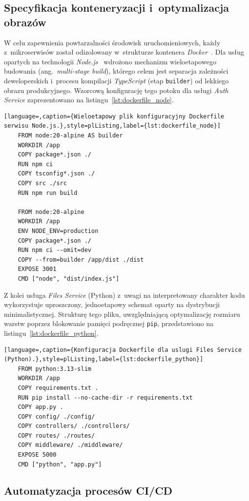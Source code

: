 \documentclass[a4paper,12pt,reqno]{article}
\begin{document}
\subsection{Specyfikacja konteneryzacji i~optymalizacja obrazów}

W celu zapewnienia powtarzalności środowisk uruchomieniowych, każdy z~mikroserwisów został odizolowany w~strukturze kontenera \textit{Docker}~\cite{docker}. Dla usług opartych na technologii \textit{Node.js}~\cite{nodejs} wdrożono mechanizm wieloetapowego budowania (ang.~\textit{multi-stage build}), którego celem jest separacja zależności deweloperskich i~procesu kompilacji \textit{TypeScript} (etap \texttt{builder}) od lekkiego obrazu produkcyjnego. Wzorcową konfigurację tego potoku dla usługi \textit{Auth Service} zaprezentowano na listingu~\ref{lst:dockerfile_node}.

\begin{lstlisting}[language=,caption={Wieloetapowy plik konfiguracyjny Dockerfile serwisu Node.js.},style=plListing,label={lst:dockerfile_node}]
	FROM node:20-alpine AS builder
	WORKDIR /app
	COPY package*.json ./
	RUN npm ci
	COPY tsconfig*.json ./
	COPY src ./src
	RUN npm run build
	
	FROM node:20-alpine
	WORKDIR /app
	ENV NODE_ENV=production
	COPY package*.json ./
	RUN npm ci --omit=dev
	COPY --from=builder /app/dist ./dist
	EXPOSE 3001
	CMD ["node", "dist/index.js"]
\end{lstlisting}

Z kolei usługa \textit{Files Service} (Python) z~uwagi na interpretowany charakter kodu wykorzystuje uproszczony, jednoetapowy schemat oparty na dystrybucji minimalistycznej. Strukturę tego pliku, uwzględniającą optymalizację rozmiaru warstw poprzez blokowanie pamięci podręcznej \texttt{pip}, przedstawiono na listingu~\ref{lst:dockerfile_python}.

\begin{lstlisting}[language=,caption={Konfiguracja Dockerfile dla uslugi Files Service (Python).},style=plListing,label={lst:dockerfile_python}]
	FROM python:3.13-slim
	WORKDIR /app
	COPY requirements.txt .
	RUN pip install --no-cache-dir -r requirements.txt
	COPY app.py .
	COPY config/ ./config/
	COPY controllers/ ./controllers/
	COPY routes/ ./routes/
	COPY middleware/ ./middleware/
	EXPOSE 5000
	CMD ["python", "app.py"]
\end{lstlisting}


\subsection{Automatyzacja procesów CI/CD}
\end{document}
